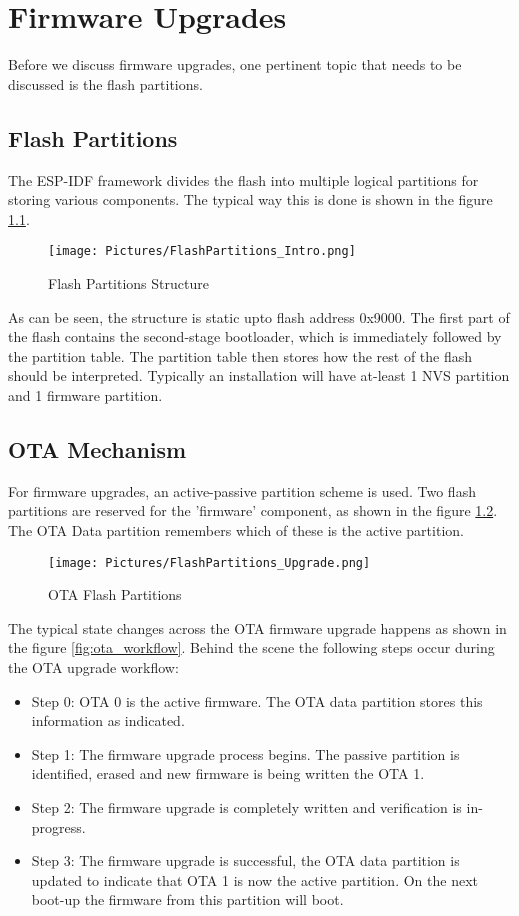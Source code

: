 \documentclass[main.tex]{subfiles}
\begin{document}
\chapter{Firmware Upgrades}

Before we discuss firmware upgrades, one pertinent topic that needs to be discussed is the flash partitions.

\section{Flash Partitions}\label{sec:flash_partitions}
The ESP-IDF framework divides the flash into multiple logical partitions for storing various components. The typical way this is done is shown in the figure \ref{fig:flash_parts}.
\begin{figure}[h!]
    \centering
    \texttt{[image: Pictures/FlashPartitions\_Intro.png]}
    \caption{Flash Partitions Structure}
    \label{fig:flash_parts}
\end{figure}

As can be seen, the structure is static upto flash address 0x9000. The first part of the flash contains the second-stage bootloader, which is immediately followed by the partition table. The partition table then stores how the rest of the flash should be interpreted. Typically an installation will have at-least 1 NVS partition and 1 firmware partition.

\section{OTA Mechanism}
For firmware upgrades, an active-passive partition scheme is used. Two flash partitions are reserved for the 'firmware' component, as shown in the figure \ref{fig:ota_flash_parts}. The OTA Data partition remembers which of these is the active partition.

\begin{figure}[h!]
    \centering
    \texttt{[image: Pictures/FlashPartitions\_Upgrade.png]}
    \caption{OTA Flash Partitions}
    \label{fig:ota_flash_parts}
\end{figure}

The typical state changes across the OTA firmware upgrade happens as shown in the figure \ref{fig:ota_workflow}. Behind the scene the following steps occur during the OTA upgrade workflow:
\begin{itemize}
    \item Step 0: OTA 0 is the active firmware. The OTA data partition stores this information as indicated.
    \item Step 1: The firmware upgrade process begins. The passive partition is identified, erased and new firmware is being written the OTA 1.
    \item Step 2: The firmware upgrade is completely written and verification is in-progress.
    \item Step 3: The firmware upgrade is successful, the OTA data partition is updated to indicate that OTA 1 is now the active partition. On the next boot-up the firmware from this partition will boot.
\end{itemize}
\end{document}

